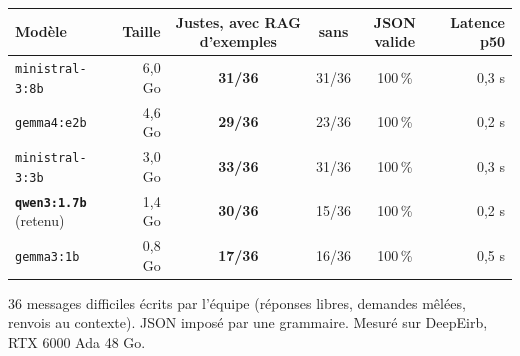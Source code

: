 \scriptsize
\begin{tabular}{@{}l r c c c r@{}}
\toprule
\textbf{Modèle} & \textbf{Taille} & \textbf{Justes, avec RAG d'exemples} & \textbf{sans} & \textbf{JSON valide} & \textbf{Latence p50} \\
\midrule
\texttt{ministral-3:8b} & 6,0 Go & \textbf{31/36} & 31/36 & 100\,\% & 0,3 s \\
\texttt{gemma4:e2b} & 4,6 Go & \textbf{29/36} & 23/36 & 100\,\% & 0,2 s \\
\texttt{ministral-3:3b} & 3,0 Go & \textbf{33/36} & 31/36 & 100\,\% & 0,3 s \\
\textbf{\texttt{qwen3:1.7b}} \textcolor{okgreen}{(retenu)} & 1,4 Go & \textbf{30/36} & 15/36 & 100\,\% & 0,2 s \\
\texttt{gemma3:1b} & 0,8 Go & \textbf{17/36} & 16/36 & 100\,\% & 0,5 s \\
\bottomrule
\end{tabular}

\smallskip
{\tiny 36 messages difficiles écrits par l'équipe (réponses libres, demandes mêlées, renvois au contexte). JSON imposé par une grammaire. Mesuré sur DeepEirb, RTX 6000 Ada 48 Go.}
